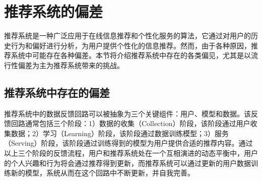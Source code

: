 \section{推荐系统的偏差}
推荐系统是一种广泛应用于在线信息推荐和个性化服务的算法，它通过对用户的历史行为和偏好进行分析，为用户提供个性化的信息推荐。然而，由于各种原因，推荐系统中可能存在各种偏差。本节将介绍推荐系统中存在的各类偏见，尤其是以流行性偏差为主为推荐系统带来的挑战。

\subsection{推荐系统中存在的偏差}
推荐系统中的数据反馈回路可以被抽象为三个关键组件：用户、模型和数据。该反馈回路通常包括三个阶段\cite{chen_bias_2021}：1）数据的收集（Collection）阶段，该阶段通过用户收集数据；2）学习（Learning）阶段，该阶段通过数据训练模型；3）服务（Serving）阶段，该阶段通过训练得到的模型为用户提供合适的推荐内容。通过以上三个阶段的反馈流程，用户和推荐系统处在一个互相演进的动态平衡中，用户的个人兴趣和行为将会通过推荐得到更新，而推荐系统可以通过更新的用户数据训练新的模型，系统从而在这个回路中不断更新，并自我完善。

